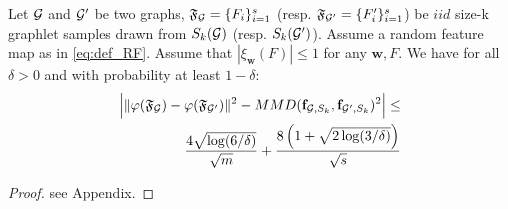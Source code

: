 \documentclass{article}
\begin{document}
\begin{theorem}\label{theorem:concentration}
Let $\mathcal{G}$ and $\mathcal{G}'$ be two graphs, $\mathfrak{F}_{\mathcal{G}}=\{F_i\}_{i=1}^{s}$ (resp. $\mathfrak{F}_{\mathcal{G}'}=\{F_i'\}_{i=1}^{s}$) be $iid$ size-k graphlet samples drawn from $S_k(\mathcal{G})$ (resp. $S_k(\mathcal{G}')$). Assume a random feature map as in \eqref{eq:def_RF}. Assume that $|\xi_\mathbf{w}(F)| \leq 1$ for any $\mathbf{w},F$.
We have for all $\delta>0$ and with probability at least $1-\delta$:
\begin{align*}
 \Big|\|\varphi(\mathfrak{F}_{\mathcal{G}}) - \varphi(\mathfrak{F}_{\mathcal{G}'})\|^2 - MMD(\mathbf{f}_{\mathcal{G},S_k},\mathbf{f}_{\mathcal{G}',S_k})^2 \Big| \leq \\\frac{4 \sqrt{\log (6/\delta)}}{\sqrt{m}} + \frac{8\left(1+\sqrt{2\log(3/\delta)}\right)}{\sqrt{{s}}}
\end{align*}
\end{theorem}

\begin{proof}
 see Appendix.
\end{proof}
\end{document}
